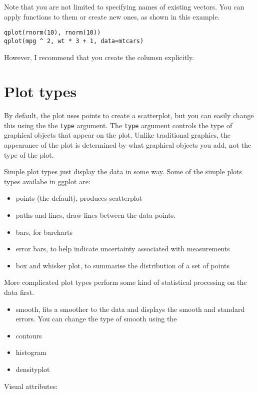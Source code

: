Note that you are not limited to specifying names of existing vectors.  You can apply functions to them or create new ones, as shown in this example.

\begin{verbatim}
qplot(rnorm(10), rnorm(10))
qplot(mpg ^ 2, wt * 3 + 1, data=mtcars)
\end{verbatim}

However, I recommend that you create the columsn explicitly.

\section{Plot types}\label{sec:plot_types}

By default, the plot uses points to create a scatterplot, but you can easily change this using the the {\tt type} argument.  The {\tt type} argument controls the type of graphical objects that appear on the plot.  Unlike traditional graphics, the appearance of the plot is determined by what graphical objects you add, not the type of the plot. 

Simple plot types just display the data in some way.  Some of the simple plots types availabe in ggplot are:

\begin{itemize}
	\item points (the default), produces scatterplot
	\item paths and lines, draw lines between the data points.  
	\item bars, for barcharts
	\item error bars, to help indicate uncertainty associated with measurements
	\item box and whisker plot, to summarise the distribution of a set of points
\end{itemize}

More complicated plot types perform some kind of statistical processing on the data first.

\begin{itemize}
	\item smooth, fits a smoother to the data and displays the smooth and standard errors.  You can change the type of smooth using the 
	\item contours
	\item histogram
	\item densityplot
\end{itemize}

Visual attributes:

